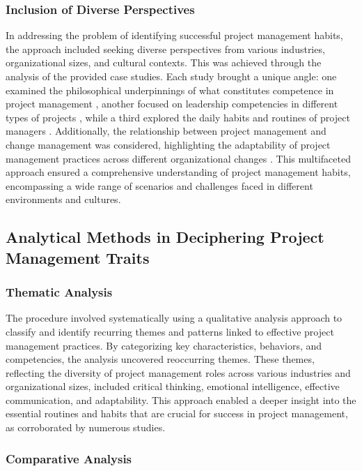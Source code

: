 \documentclass{article}
\begin{document}
\subsubsection{Inclusion of Diverse Perspectives}

In addressing the problem of identifying successful project management habits, the approach included seeking diverse perspectives from various industries, organizational sizes, and cultural contexts. This was achieved through the analysis of the provided case studies. Each study brought a unique angle: one examined the philosophical underpinnings of what constitutes competence in project management \cite{bredillet2015good}, another focused on leadership competencies in different types of projects \cite{muller2010leadership}, while a third explored the daily habits and routines of project managers \cite{sigurdhssonpatterns}. Additionally, the relationship between project management and change management was considered, highlighting the adaptability of project management practices across different organizational changes \cite{pollack2016project}. This multifaceted approach ensured a comprehensive understanding of project management habits, encompassing a wide range of scenarios and challenges faced in different environments and cultures.

\subsection{Analytical Methods in Deciphering Project Management Traits}

\subsubsection{Thematic Analysis}

The procedure involved systematically using a qualitative analysis approach to classify and identify recurring themes and patterns linked to effective project management practices. By categorizing key characteristics, behaviors, and competencies, the analysis uncovered reoccurring themes. These themes, reflecting the diversity of project management roles across various industries and organizational sizes, included critical thinking, emotional intelligence, effective communication, and adaptability. This approach enabled a deeper insight into the essential routines and habits that are crucial for success in project management, as corroborated by numerous studies.


\subsubsection{Comparative Analysis}
\end{document}
